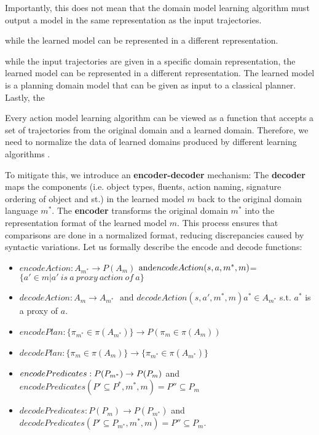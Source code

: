 
Importantly, this does not mean that the domain model learning algorithm must output a model in the same representation as the input trajectories. 


while the learned model can be represented in a different representation.

while the input trajectories are given in a specific domain representation, the learned model can be represented in a different representation. 
The learned model is a planning domain model that can be given as input to a classical planner. 
Lastly, the 






Every action model learning algorithm can be viewed as a function that accepts a set of trajectories from the original domain and a learned domain. Therefore, we need to normalize the data of learned domains produced by different learning algorithms . 

To mitigate this, we introduce an \textbf{encoder-decoder} mechanism: The \textbf{decoder} maps the components (i.e. object types, fluents, action naming, signature ordering of object and st.) in the learned model \( m \) back to the original domain language \( m^* \). The  \textbf{encoder} transforms the original domain \( m^* \) into the representation format of the learned model \( m \). This process ensures that comparisons are done in a normalized format, reducing discrepancies caused by syntactic variations. Let us formally describe the encode and decode functions:
\begin{itemize}
    \item ${encodeAction: A_{m^*}\rightarrow P(A_m)}$$\text{ and} \\ encodeAction(s,a,m^*,m)$=
${\{a'\in m| a'\ is\ a\ proxy\ action\ of\ a\}}$
    \item ${\mathit{decodeAction}: A_{m}\rightarrow  A_{m^*} }$ $\text{ and } {\mathit{decodeAction}(s,a',m^*,m)}$$  a^*\in A_{m^*}$ s.t. $a^*$ is a proxy of $a$. 
\end{itemize}

\begin{itemize}
    \item $encodePlan: \{\pi_{m^*}\in \pi(A_{m^*})\}\rightarrow P(\pi_{m}\in \pi(A_{m}))$
    \item $\mathit{decodePlan}:\{\pi_{m}\in \pi(A_{m})\} \rightarrow  \{\pi_{m^*}\in \pi(A_{m^*})\}$
\end{itemize}

\begin{itemize}
    \item $encodePredicates:P( P_{m^*}) \rightarrow  P(P_m) \\$  and $encode{Predicates}(P'\subseteq P^*,m^*,m) = P''\subseteq P_m$
    \item $\mathit{decodePredicates}: P( P_{m}) \rightarrow  P(P_{m^*}) $  and $\mathit{decodePredicates}(P'\subseteq P_{m^*},m^*,m) = P''\subseteq P_m$. 
\end{itemize}

